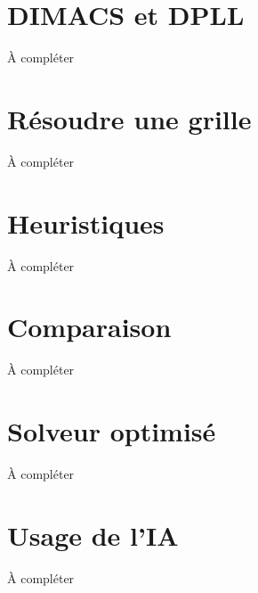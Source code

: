 \documentclass[aspectratio=169,11pt]{beamer}
\begin{document}
\section{DIMACS et DPLL}
\begin{frame}{À compléter}\end{frame}

\section{Résoudre une grille}
\begin{frame}{À compléter}\end{frame}

\section{Heuristiques}
\begin{frame}{À compléter}\end{frame}

\section{Comparaison}
\begin{frame}{À compléter}\end{frame}

\section{Solveur optimisé}
\begin{frame}{À compléter}\end{frame}

\section{Usage de l'IA}
\begin{frame}{À compléter}\end{frame}
\end{document}
